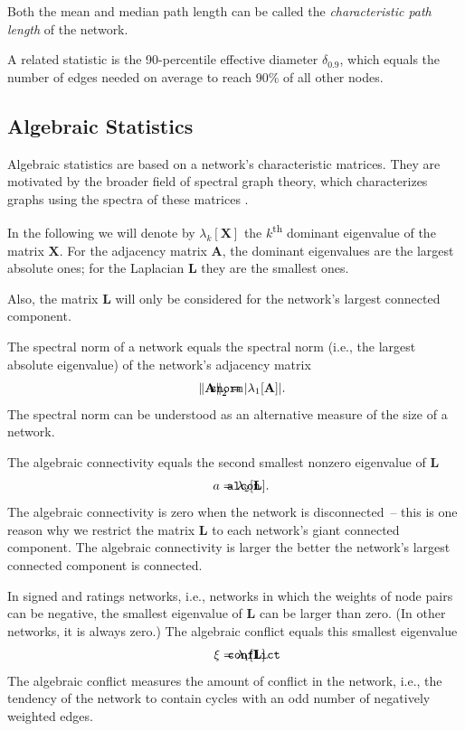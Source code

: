 \documentclass{article}
\def\mathnote#1{%
  \tag*{\rlap{\hspace\marginparsep\smash{\parbox[t]{\marginparwidth}{#1}}}}
}
\begin{document}
Both the mean and median path length can be called the
\emph{characteristic path length} of the network.

A related statistic is the 90-percentile effective diameter
$\delta_{0.9}$, which equals the number of edges needed on average to
reach 90\% of all other nodes.

\subsection{Algebraic Statistics}

Algebraic statistics are based on a network's characteristic matrices.
They are motivated by the broader field of spectral graph theory, which
characterizes graphs using the spectra of these matrices \citep{b285}.

In the following we will denote by $\lambda_k[\mathbf X]$ the
$k$\textsuperscript{th} dominant eigenvalue of the matrix $\mathbf X$.
For the adjacency matrix $\mathbf A$, the dominant eigenvalues are the
largest absolute ones; for the Laplacian $\mathbf L$ they are the
smallest ones.

Also, the matrix $\mathbf L$ will only be considered for the network's
largest connected component.

The spectral norm of a network equals the spectral norm (i.e., the
largest absolute eigenvalue) of the network's adjacency matrix
\begin{align}
  \mathnote{\texttt{snorm}} 
  \left\| \mathbf A \right\|_2
  &= 
  | \lambda_1[\mathbf A] | .
\end{align}
The spectral norm can be understood as an alternative measure of the
size of a network.

The algebraic connectivity equals the second smallest nonzero eigenvalue
of $\mathbf L$ \citep{b652}
\begin{align}
  \mathnote{\texttt{alcon}} a &= \lambda_2[\mathbf L].
\end{align}
The algebraic connectivity is zero when the network is disconnected~--
this is one reason why we restrict the matrix $\mathbf L$ to each
network's giant connected component.  The algebraic connectivity is
larger the better the network's largest connected component is
connected.

In signed and ratings networks, i.e., networks in which the weights of
node pairs can be negative, the smallest eigenvalue of $\mathbf L$ can
be larger than zero.  (In other networks, it is always zero.) The
algebraic conflict equals this smallest eigenvalue
\begin{align}
  \mathnote{\texttt{conflict}} \xi &= \lambda_1[\mathbf L].
\end{align}
The algebraic conflict measures the amount of conflict in the network,
i.e., the tendency of the network to contain cycles with an odd number
of negatively weighted edges.
\end{document}
